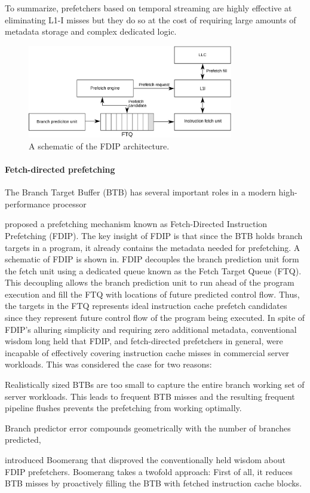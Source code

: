 \documentclass[../main.tex]{subfiles}
\begin{document}
\begin{refsection}
To summarize, prefetchers based on temporal streaming are highly effective at eliminating L1-I misses but they do so at the cost of requiring large amounts of metadata storage and complex dedicated logic.

\begin{figure}[ht]
  \centering
  \includegraphics[width=0.8\textwidth]{figures/fdip1.pdf}
  \caption{\label{fig:fdip} A schematic of the FDIP architecture.}
\end{figure}

\paragraph{Fetch-directed prefetching}
The Branch Target Buffer (BTB) has several important roles in a modern high-performance processor

\textcite{reinman99_fetch_direc_instr_prefet} proposed a prefetching
mechanism known as Fetch-Directed Instruction Prefetching (FDIP). The
key insight of FDIP is that since the BTB holds branch targets in a
program, it already contains the metadata needed for prefetching. A
schematic of FDIP is shown in. FDIP decouples the
branch prediction unit form the fetch unit using a dedicated queue
known as the Fetch Target Queue (FTQ). This decoupling allows the
branch prediction unit to run ahead of the program execution and fill
the FTQ with locations of future predicted control flow. Thus, the
targets in the FTQ represents ideal instruction cache prefetch
candidates since they represent future control flow of the program
being executed. In spite of FDIP's alluring simplicity and requiring
zero additional metadata, conventional wisdom long held that FDIP, and
fetch-directed prefetchers in general, were incapable of effectively
covering instruction cache misses in commercial server workloads. This was considered the case for two reasons: \begin{inparaenum}  \item Realistically sized BTBs are too small to capture the entire branch working set of server workloads. This leads to frequent BTB misses and the resulting frequent pipeline flushes prevents the prefetching from working optimally. \item Branch predictor error compounds geometrically with the number of branches predicted, 
\end{inparaenum}
\textcite{kumar17_boomer} introduced Boomerang that disproved the conventionally held wisdom about FDIP prefetchers. Boomerang takes a twofold approach: First of all, it reduces BTB misses by proactively filling the BTB with fetched instruction cache blocks. 




\end{refsection}
\end{document}
